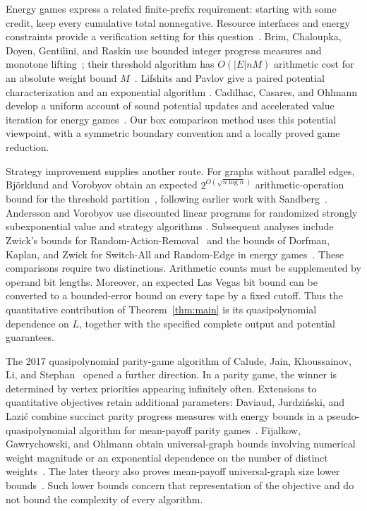Energy games express a related finite-prefix requirement: starting with
some credit, keep every cumulative total nonnegative. Resource
interfaces and energy constraints provide a verification setting for
this question~\cite{ChakrabartiEtAl2003,BouyerEtAl2008}. Brim,
Chaloupka, Doyen, Gentilini, and Raskin use bounded integer progress
measures and monotone lifting~\cite{BrimEtAl2011}; their threshold
algorithm has $O(|E|nM)$ arithmetic cost for an absolute weight bound
$M$~\cite[Theorem~8]{BrimEtAl2011}. Lifshits and Pavlov give a paired
potential characterization and an exponential algorithm
\cite{LifshitsPavlov2007}. Cadilhac, Casares, and Ohlmann develop a
uniform account of sound potential updates and accelerated value
iteration for energy games~\cite{CadilhacCasaresOhlmann2025}.
Our box comparison method uses this potential viewpoint, with a
symmetric boundary convention and a locally proved game reduction.

Strategy improvement supplies another route. For graphs without
parallel edges, Bj\"orklund and Vorobyov obtain an expected
$2^{O(\sqrt{n\log n})}$ arithmetic-operation bound for the threshold
partition~\cite[Theorem~7.1]{BjorklundVorobyov2007}, following earlier
work with Sandberg~\cite{BjorklundSandbergVorobyov2004}. Andersson and
Vorobyov use discounted linear programs for randomized strongly
subexponential value and strategy algorithms
\cite{AnderssonVorobyov2006}. Subsequent analyses include Zwick's
bounds for Random-Action-Removal~\cite{Zwick2026} and the bounds of
Dorfman, Kaplan, and Zwick for Switch-All and Random-Edge in energy
games~\cite{DorfmanKaplanZwick2026}. These comparisons require two
distinctions. Arithmetic counts must be supplemented by operand bit
lengths. Moreover, an expected Las Vegas bit bound can be converted to
a bounded-error bound on every tape by a fixed cutoff. Thus the
quantitative contribution of Theorem~\ref{thm:main} is its
quasipolynomial dependence on $L$, together with the specified complete
output and potential guarantees.

The 2017 quasipolynomial parity-game algorithm of Calude, Jain,
Khoussainov, Li, and Stephan~\cite{CaludeJainKhoussainovLiStephan2022}
opened a further direction. In a parity game, the winner is determined
by vertex priorities appearing infinitely often. Extensions to
quantitative objectives retain additional parameters: Daviaud,
Jurdzi\'nski, and Lazi\'c combine succinct parity progress measures
with energy bounds in a pseudo-quasipolynomial algorithm for
mean-payoff parity games~\cite{DaviaudJurdzinskiLazic2018}.
Fijalkow, Gawrychowski, and Ohlmann obtain universal-graph bounds
involving numerical weight magnitude or an exponential dependence on
the number of distinct weights~\cite{FijalkowGawrychowskiOhlmann2020}.
The later theory also proves mean-payoff universal-graph size lower
bounds~\cite[Section~7]{ColcombetFijalkowGawrychowskiOhlmann2022}.
Such lower bounds concern that representation of the objective and do
not bound the complexity of every algorithm.

